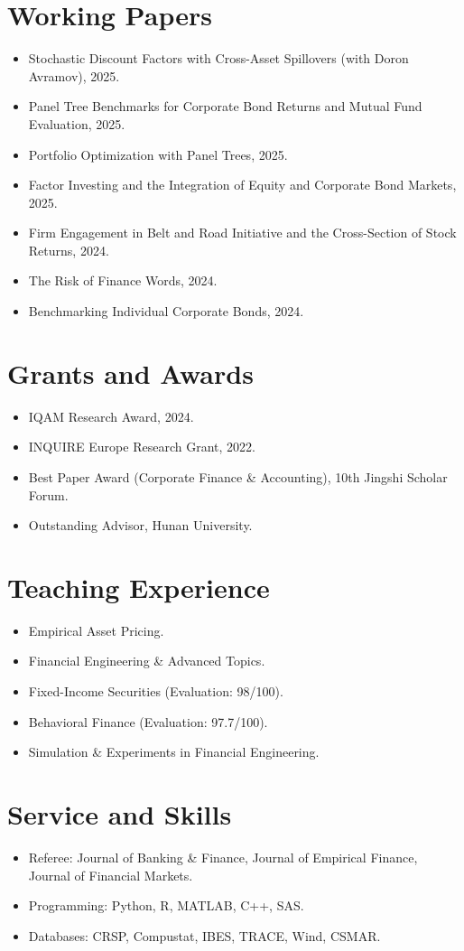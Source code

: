\documentclass[11pt,a4paper]{article}
\begin{document}
\section*{Working Papers}
\begin{itemize}[leftmargin=*]
    \item Stochastic Discount Factors with Cross-Asset Spillovers (with Doron Avramov), 2025.
    \item Panel Tree Benchmarks for Corporate Bond Returns and Mutual Fund Evaluation, 2025.
    \item Portfolio Optimization with Panel Trees, 2025.
    \item Factor Investing and the Integration of Equity and Corporate Bond Markets, 2025.
    \item Firm Engagement in Belt and Road Initiative and the Cross-Section of Stock Returns, 2024.
    \item The Risk of Finance Words, 2024.
    \item Benchmarking Individual Corporate Bonds, 2024.
\end{itemize}

\section*{Grants and Awards}
\begin{itemize}[leftmargin=*]
    \item IQAM Research Award, 2024.
    \item INQUIRE Europe Research Grant, 2022.
    \item Best Paper Award (Corporate Finance \& Accounting), 10th Jingshi Scholar Forum.
    \item Outstanding Advisor, Hunan University.
\end{itemize}

\section*{Teaching Experience}
\begin{itemize}[leftmargin=*]
    \item Empirical Asset Pricing.
    \item Financial Engineering \& Advanced Topics.
    \item Fixed-Income Securities (Evaluation: 98/100).
    \item Behavioral Finance (Evaluation: 97.7/100).
    \item Simulation \& Experiments in Financial Engineering.
\end{itemize}

\section*{Service and Skills}
\begin{itemize}[leftmargin=*]
    \item Referee: Journal of Banking \& Finance, Journal of Empirical Finance, Journal of Financial Markets.
    \item Programming: Python, R, MATLAB, C++, SAS.
    \item Databases: CRSP, Compustat, IBES, TRACE, Wind, CSMAR.
\end{itemize}
\end{document}
